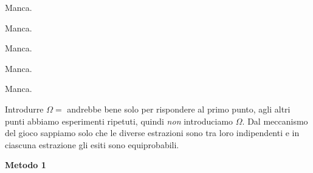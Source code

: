 \Soluzione

Manca.

\Soluzione

Manca.

\Soluzione

Manca.

\Soluzione

Manca.

\Soluzione

Manca.

\Soluzione

Introdurre $\Omega =$  andrebbe bene solo per rispondere al primo punto, agli altri punti abbiamo esperimenti ripetuti, quindi \textit{non} introduciamo $\Omega $. Dal meccanismo del gioco sappiamo solo che le diverse estrazioni sono tra loro indipendenti e in ciascuna estrazione gli esiti sono equiprobabili.

\textbf{Metodo 1}

